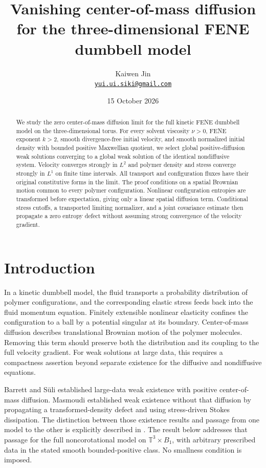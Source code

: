 \documentclass[11pt]{article}
\title{Vanishing center-of-mass diffusion for the three-dimensional FENE dumbbell model}
\author{Kaiwen Jin\\\small\href{mailto:yui.ui.siki@gmail.com}{\texttt{yui.ui.siki@gmail.com}}}
\date{15 October 2026}
\numberwithin{equation}{section}
\newcommand{\T}{\mathbb T^3}
\begin{document}
\maketitle
\begin{abstract}
We study the zero center-of-mass diffusion limit for the full kinetic FENE
dumbbell model on the three-dimensional torus. For every solvent viscosity
$\nu>0$, FENE exponent $k>2$, smooth divergence-free initial velocity, and
smooth normalized initial density with bounded positive Maxwellian quotient,
we select global positive-diffusion weak solutions converging to a global
weak solution of the identical nondiffusive system. Velocity converges strongly
in $L^2$ and polymer density and stress converge strongly in $L^1$ on finite
time intervals. All transport and configuration fluxes have their original
constitutive forms in the limit. The proof conditions on a spatial Brownian
motion common to every polymer configuration. Nonlinear configuration
entropies are transformed before expectation, giving only a linear spatial
diffusion term. Conditional stress cutoffs, a transported limiting normalizer,
and a joint covariance estimate then propagate a zero entropy defect without
assuming strong convergence of the velocity gradient.
\end{abstract}

\section*{Introduction}
In a kinetic dumbbell model, the fluid transports a probability distribution
of polymer configurations, and the corresponding elastic stress feeds back
into the fluid momentum equation. Finitely extensible nonlinear elasticity
confines the configuration to a ball by a potential singular at its boundary.
Center-of-mass diffusion describes translational Brownian motion of the
polymer molecules. Removing this term should preserve both the distribution
and its coupling to the full velocity gradient. For weak solutions at large
data, this requires a compactness assertion beyond separate existence for the
diffusive and nondiffusive equations.

Barrett and S\"uli \cite{BS} established large-data weak existence with positive
center-of-mass diffusion. Masmoudi \cite{Masmoudi} established weak existence
without that diffusion by propagating a transformed-density defect and using
stress-driven Stokes dissipation. The distinction between those existence
results and passage from one model to the other is explicitly described in
\cite[Section~1]{DS}. The result below addresses that passage for the full
noncorotational model on $\T\times B_1$, with arbitrary prescribed data in
the stated smooth bounded-positive class. No smallness condition is imposed.
\end{document}
